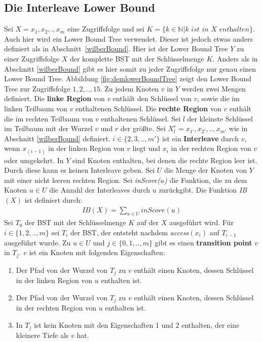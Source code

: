 \documentclass[a4paper,12pt]{article}
\begin{document}
\subsection{Die Interleave Lower Bound} \label{interBound}
Sei $X = x_1,x_2,.,x_m$ eine Zugriffsfolge und sei $K = \{k \in \mathbb{N} \vert k \textit{ ist in $X$ enthalten}\}$. Auch hier wird ein Lower Bound Tree verwendet. Dieser ist jedoch etwas anders definiert als in \mbox{Abschnitt \ref{wilberBound}}. Hier ist der Lower Bound Tree $Y$ zu einer Zugriffsfolge $X$ der komplette BST mit der Schlüsselmenge $K$. Anders als in Abschnitt \ref{wilberBound}  gibt es hier somit zu jeder Zugriffsfolge nur genau einen Lower Bound Tree. Abbildung \ref{fig:demlowerBoundTree} zeigt den Lower Bound Tree zur Zugriffsfolge $1, 2,.., 15$. Zu jedem Knoten $v$ in $Y$ werden zwei Mengen definiert. Die \textbf{linke Region} von $v$ enthält den Schlüssel von $v$, sowie die im linken Teilbaum von $v$ enthaltenen Schlüssel.  Die \textbf{rechte Region} von $v$ enthält die im rechten Teilbaum von $v$ enthaltenen Schlüssel. Sei $l$ der kleinste Schlüssel im Teilbaum mit der Wurzel $v$ und $r$ der größte. Sei  $X^r_l = {x_{1'},x_{2'},..,x_{m'}}$ wie in Abschnitt \ref{wilberBound} definiert. $i \in \{2,3,..,m'\}$ ist ein \textbf{Interleave} durch $v$, wenn $x_{\left(i -1\right)}$ in der linken Region von $v$ liegt und $x_i$ in der rechten Region von $v$ oder umgekehrt. In $Y$ sind Knoten enthalten, bei denen die rechte Region leer ist. Durch diese kann es keinen Interleave geben. Sei $U$ die Menge der Knoten von $Y$ mit einer nicht leeren rechten Region. Sei \textit{inScore($u$)} die Funktion, die zu dem Knoten $u \in U$ die Anzahl der Interleaves durch $u$ zurückgibt.  Die Funktion \textit{IB}$\left(X\right)$ ist definiert durch:
\begin{align*}
\mathit{IB}\left(X\right) = \sum_{u \in U} \mathit{inScore}\left(u\right)
\end{align*}
Sei $T_0$ der BST mit der Schlüsselmenge $K$ auf der $X$ ausgeführt wird. Für $i \in \{1,2,..,m\}$ sei $T_i$ der BST, der entsteht nachdem \textit{access}$\left(x_i\right)$ auf $T_{i-1}$ ausgeführt wurde. Zu $u \in U$ und  $j \in \{0,1,..,m\}$ gibt es einen \textbf{transition point} $v$ in $T_j$. $v$ ist ein Knoten mit folgenden Eigenschaften:\\
\begin{enumerate}
	\item Der Pfad von der Wurzel von $T_j$ zu $v$ enthält einen Knoten, dessen Schlüssel in der linken Region von $u$ enthalten ist.
	\item Der Pfad von der Wurzel von $T_j$ zu $v$ enthält einen Knoten, dessen Schlüssel in der rechten Region von $u$ enthalten ist.
	\item In $T_j$ ist kein Knoten mit den Eigenschaften 1 und 2 enthalten, der eine kleinere Tiefe als $v$ hat. 
\end{enumerate}
\end{document}
